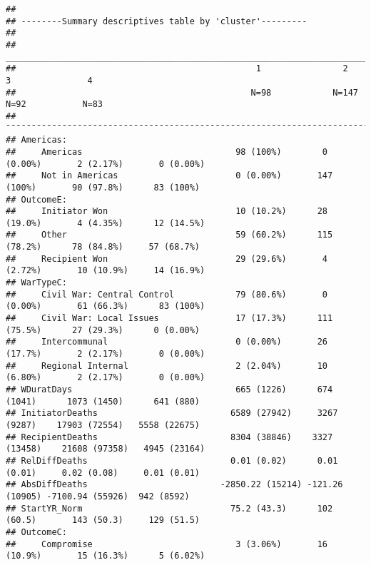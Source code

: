 \documentclass[
]{article}
\begin{document}
\begin{verbatim}
## 
## --------Summary descriptives table by 'cluster'---------
## 
## ______________________________________________________________________________________________________ 
##                                               1                2               3               4       
##                                              N=98            N=147            N=92           N=83      
## ¯¯¯¯¯¯¯¯¯¯¯¯¯¯¯¯¯¯¯¯¯¯¯¯¯¯¯¯¯¯¯¯¯¯¯¯¯¯¯¯¯¯¯¯¯¯¯¯¯¯¯¯¯¯¯¯¯¯¯¯¯¯¯¯¯¯¯¯¯¯¯¯¯¯¯¯¯¯¯¯¯¯¯¯¯¯¯¯¯¯¯¯¯¯¯¯¯¯¯¯¯¯ 
## Americas:                                                                                              
##     Americas                              98 (100%)        0 (0.00%)       2 (2.17%)       0 (0.00%)   
##     Not in Americas                       0 (0.00%)       147 (100%)       90 (97.8%)      83 (100%)   
## OutcomeE:                                                                                              
##     Initiator Won                         10 (10.2%)      28 (19.0%)       4 (4.35%)      12 (14.5%)   
##     Other                                 59 (60.2%)      115 (78.2%)      78 (84.8%)     57 (68.7%)   
##     Recipient Won                         29 (29.6%)       4 (2.72%)       10 (10.9%)     14 (16.9%)   
## WarTypeC:                                                                                              
##     Civil War: Central Control            79 (80.6%)       0 (0.00%)       61 (66.3%)      83 (100%)   
##     Civil War: Local Issues               17 (17.3%)      111 (75.5%)      27 (29.3%)      0 (0.00%)   
##     Intercommunal                         0 (0.00%)       26 (17.7%)       2 (2.17%)       0 (0.00%)   
##     Regional Internal                     2 (2.04%)       10 (6.80%)       2 (2.17%)       0 (0.00%)   
## WDuratDays                                665 (1226)      674 (1041)      1073 (1450)      641 (880)   
## InitiatorDeaths                          6589 (27942)     3267 (9287)    17903 (72554)   5558 (22675)  
## RecipientDeaths                          8304 (38846)    3327 (13458)    21608 (97358)   4945 (23164)  
## RelDiffDeaths                            0.01 (0.02)      0.01 (0.01)     0.02 (0.08)     0.01 (0.01)  
## AbsDiffDeaths                          -2850.22 (15214) -121.26 (10905) -7100.94 (55926)  942 (8592)   
## StartYR_Norm                             75.2 (43.3)      102 (60.5)       143 (50.3)     129 (51.5)   
## OutcomeC:                                                                                              
##     Compromise                            3 (3.06%)       16 (10.9%)       15 (16.3%)      5 (6.02%)   

\end{verbatim}
\end{document}
